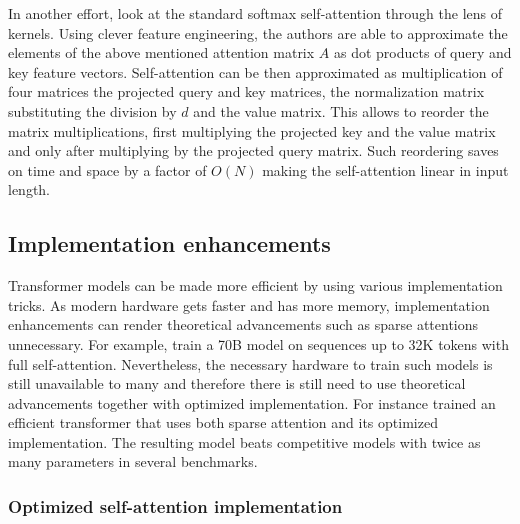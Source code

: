In another effort, \cite{choromanski2020rethinking} look at the standard
softmax self-attention through the lens of kernels. Using clever feature
engineering, the authors are able to approximate the elements of the above
mentioned attention matrix $A$ as dot products of query and key feature
vectors. Self-attention can be then approximated as multiplication of four
matrices the projected query and key matrices, the normalization matrix
substituting the division by $d$ and the value matrix. This allows to reorder
the matrix multiplications, first multiplying the projected key and the value
matrix and only after multiplying by the projected query matrix. Such
reordering saves on time and space by a factor of $O(N)$ making the
self-attention linear in input length.

\subsection{Implementation enhancements}

Transformer models can be made more efficient by using various implementation
tricks. As modern hardware gets faster and has more memory, implementation
enhancements can render theoretical advancements such as sparse attentions
unnecessary. For example, \cite{xiong2023effective} train a 70B model on
sequences up to 32K tokens with full self-attention. Nevertheless, the
necessary hardware to train such models is still unavailable to many and
therefore there is still need to use theoretical advancements together with
optimized implementation. For instance \cite{jiang2023mistral} trained an
efficient transformer that uses both sparse attention and its optimized
implementation. The resulting model beats competitive models with twice as many
parameters in several benchmarks.

\subsubsection{Optimized self-attention implementation}

